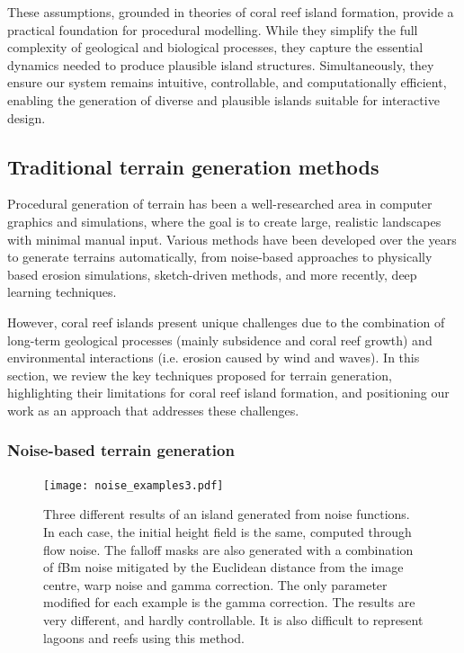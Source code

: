 These assumptions, grounded in theories of coral reef island formation, provide a practical foundation for procedural modelling. While they simplify the full complexity of geological and biological processes, they capture the essential dynamics needed to produce plausible island structures. Simultaneously, they ensure our system remains intuitive, controllable, and computationally efficient, enabling the generation of diverse and plausible islands suitable for interactive design.





\subsection{Traditional terrain generation methods}
\label{sec:coral-island-sota-traditional}

Procedural generation of terrain has been a well-researched area in computer graphics and simulations, where the goal is to create large, realistic landscapes with minimal manual input. Various methods have been developed over the years to generate terrains automatically, from noise-based approaches to physically based erosion simulations, sketch-driven methods, and more recently, deep learning techniques.

However, coral reef islands present unique challenges due to the combination of long-term geological processes (mainly subsidence and coral reef growth) and environmental interactions (i.e. erosion caused by wind and waves). In this section, we review the key techniques proposed for terrain generation, highlighting their limitations for coral reef island formation, and positioning our work as an approach that addresses these challenges.

\subsubsection{Noise-based terrain generation}

\begin{figure}
    \texttt{[image: noise\_examples3.pdf]}
    \caption[Islands generation using fBm noise and falloff masks]{Three different results of an island generated from noise functions. In each case, the initial height field is the same, computed through flow noise. The falloff masks are also generated with a combination of fBm noise mitigated by the Euclidean distance from the image centre, warp noise and gamma correction. The only parameter modified for each example is the gamma correction. The results are very different, and hardly controllable. It is also difficult to represent lagoons and reefs using this method.}
    \label{fig:coral-island-noise-example}
\end{figure}

